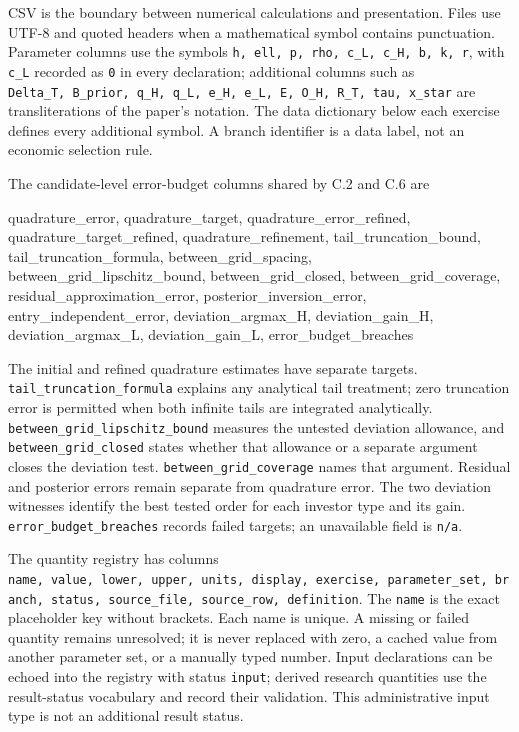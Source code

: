 \documentclass[
  11pt,
]{article}
\newenvironment{Shaded}{}{}
\newcommand{\NormalTok}[1]{#1}
\begin{document}
CSV is the boundary between numerical calculations and presentation.
Files use UTF-8 and quoted headers when a mathematical symbol contains
punctuation. Parameter columns use the symbols
\texttt{h,\ ell,\ p,\ rho,\ c\_L,\ c\_H,\ b,\ k,\ r}, with \texttt{c\_L}
recorded as \texttt{0} in every declaration; additional columns
such as
\texttt{Delta\_T,\ B\_prior,\ q\_H,\ q\_L,\ e\_H,\ e\_L,\ E,\ O\_H,\ R\_T,\ tau,\ x\_star}
are transliterations of the paper's notation. The data dictionary below
each exercise defines every additional symbol. A branch identifier is a
data label, not an economic selection rule.

The candidate-level error-budget columns shared by C.2 and C.6 are

\begin{Shaded}
\begin{Highlighting}[]
\NormalTok{quadrature\_error, quadrature\_target, quadrature\_error\_refined,}
\NormalTok{quadrature\_target\_refined, quadrature\_refinement, tail\_truncation\_bound,}
\NormalTok{tail\_truncation\_formula, between\_grid\_spacing, between\_grid\_lipschitz\_bound,}
\NormalTok{between\_grid\_closed, between\_grid\_coverage, residual\_approximation\_error,}
\NormalTok{posterior\_inversion\_error, entry\_independent\_error, deviation\_argmax\_H,}
\NormalTok{deviation\_gain\_H, deviation\_argmax\_L, deviation\_gain\_L, error\_budget\_breaches}
\end{Highlighting}
\end{Shaded}

The initial and refined quadrature estimates have separate targets.
\texttt{tail\_truncation\_formula} explains any analytical tail
treatment; zero truncation error is permitted when both infinite tails
are integrated analytically. \texttt{between\_grid\_lipschitz\_bound}
measures the untested deviation allowance, and
\texttt{between\_grid\_closed} states whether that allowance or a
separate argument closes the deviation test.
\texttt{between\_grid\_coverage} names that argument. Residual and
posterior errors remain separate from quadrature error. The two
deviation witnesses identify the best tested order for each investor
type and its gain. \texttt{error\_budget\_breaches} records failed
targets; an unavailable field is \texttt{n/a}.

The quantity registry has columns
\texttt{name,\ value,\ lower,\ upper,\ units,\ display,\ exercise,\ parameter\_set,\ branch,\ status,\ source\_file,\ source\_row,\ definition}.
The \texttt{name} is the exact placeholder key without brackets. Each
name is unique. A missing or failed quantity remains unresolved; it is
never replaced with zero, a cached value from another parameter set, or
a manually typed number. Input declarations can be echoed into the
registry with status \texttt{input}; derived research quantities use the
result-status vocabulary and record their validation. This
administrative input type is not an additional result status.
\end{document}
